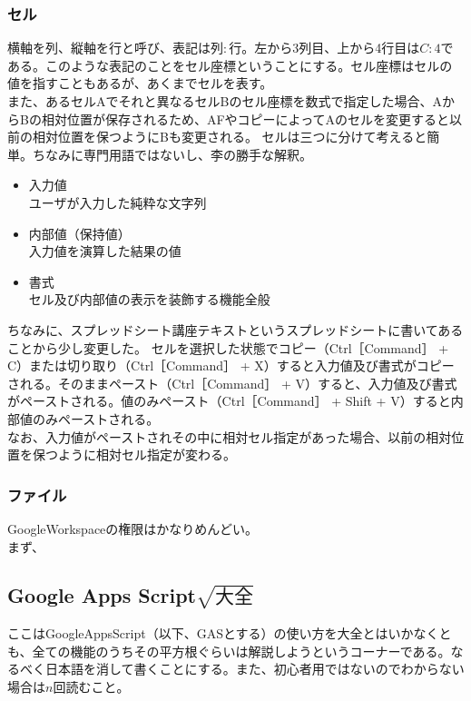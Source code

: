 \documentclass[dvipdfmx,jb5]{jarticle}
\begin{document}
  \subsubsection{セル}
  横軸を列、縦軸を行と呼び、表記は$列:行$。左から3列目、上から4行目は$C:4$である。このような表記のことをセル座標ということにする。セル座標はセルの値を指すこともあるが、あくまでセルを表す。
\\
  また、あるセルAでそれと異なるセルBのセル座標を数式で指定した場合、AからBの相対位置が保存されるため、AFやコピーによってAのセルを変更すると以前の相対位置を保つようにBも変更される。
  セルは三つに分けて考えると簡単。ちなみに専門用語ではないし、李の勝手な解釈。
  \begin{itemize}
  \item 入力値\\
  ユーザが入力した純粋な文字列
  \item 内部値（保持値）\\
  入力値を演算した結果の値
  \item 書式\\
  セル及び内部値の表示を装飾する機能全般
  \end{itemize}
  ちなみに、スプレッドシート講座テキストというスプレッドシートに書いてあることから少し変更した。
  セルを選択した状態でコピー（Ctrl［Command］ + C）または切り取り（Ctrl［Command］ + X）すると入力値及び書式がコピーされる。そのままペースト（Ctrl［Command］ + V）すると、入力値及び書式がペーストされる。値のみペースト（Ctrl［Command］ + Shift + V）すると内部値のみペーストされる。
  \\
  なお、入力値がペーストされその中に相対セル指定があった場合、以前の相対位置を保つように相対セル指定が変わる。
  \subsubsection{ファイル}
  GoogleWorkspaceの権限はかなりめんどい。
  \\
  まず、
  
  
    \subsection{Google Apps Script$\sqrt{大全}$}
  ここはGoogleAppsScript（以下、GASとする）の使い方を大全とはいかなくとも、全ての機能のうちその平方根ぐらいは解説しようというコーナーである。なるべく日本語を消して書くことにする。また、初心者用ではないのでわからない場合は$n$回読むこと。
  
  
\end{document}
